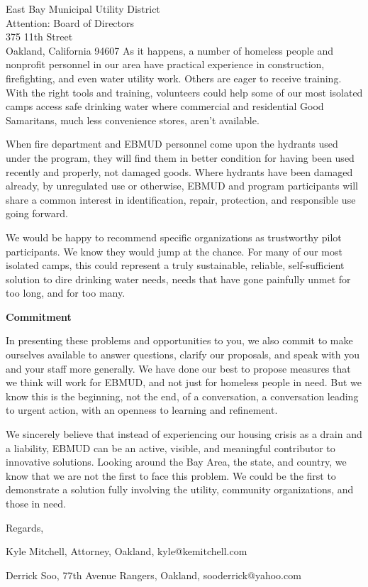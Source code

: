 \documentclass[letterpaper]{letter}
\begin{document}
\begin{letter}{%
    East Bay Municipal Utility District\\
    Attention: Board of Directors\\
    375 11th Street\\
    Oakland, California 94607}
    As it happens, a number of homeless people and nonprofit personnel in our area have practical experience in construction, firefighting, and even water utility work. Others are eager to receive training. With the right tools and training, volunteers could help some of our most isolated camps access safe drinking water where commercial and residential Good Samaritans, much less convenience stores, aren’t available.

    When fire department and EBMUD personnel come upon the hydrants used under the program, they will find them in better condition for having been used recently and properly, not damaged goods. Where hydrants have been damaged already, by unregulated use or otherwise, EBMUD and program participants will share a common interest in identification, repair, protection, and responsible use going forward.

    We would be happy to recommend specific organizations as trustworthy pilot participants. We know they would jump at the chance. For many of our most isolated camps, this could represent a truly sustainable, reliable, self-sufficient solution to dire drinking water needs, needs that have gone painfully unmet for too long, and for too many.

    \stopbreaks
    \textbf{Commitment}

    In presenting these problems and opportunities to you, we also commit to make ourselves available to answer questions, clarify our proposals, and speak with you and your staff more generally. We have done our best to propose measures that we think will work for EBMUD, and not just for homeless people in need. But we know this is the beginning, not the end, of a conversation, a conversation leading to urgent action, with an openness to learning and refinement.
    \startbreaks

    We sincerely believe that instead of experiencing our housing crisis as a drain and a liability, EBMUD can be an active, visible, and meaningful contributor to innovative solutions. Looking around the Bay Area, the state, and country, we know that we are not the first to face this problem. We could be the first to demonstrate a solution fully involving the utility, community organizations, and those in need.

    \begin{samepage}
    Regards,

    Kyle Mitchell, Attorney, Oakland, kyle@kemitchell.com

    Derrick Soo, 77th Avenue Rangers, Oakland, sooderrick@yahoo.com


\end{samepage}
\end{letter}
\end{document}
